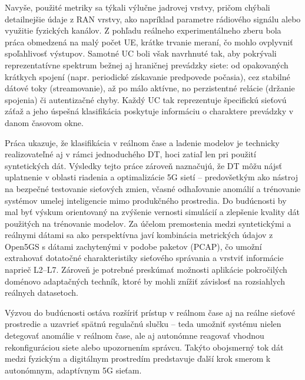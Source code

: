 Navyše, použité metriky sa týkali výlučne jadrovej vrstvy, pričom chýbali detailnejšie údaje z RAN vrstvy, ako napríklad parametre rádiového signálu alebo využitie fyzických kanálov. Z pohľadu reálneho experimentálneho zberu bola práca obmedzená na malý počet UE, krátke trvanie meraní, čo mohlo ovplyvniť spoľahlivosť výstupov. Samotné UC boli však navrhnuté tak, aby pokrývali reprezentatívne spektrum bežnej aj hraničnej prevádzky siete: od opakovaných krátkych spojení (napr. periodické získavanie predpovede počasia), cez stabilné dátové toky (streamovanie), až po málo aktívne, no perzistentné relácie (držanie spojenia) či autentizačné chyby. Každý UC tak reprezentuje špecifickú sieťovú záťaž a jeho úspešná klasifikácia poskytuje informáciu o charaktere prevádzky v danom časovom okne.

Práca ukazuje, že klasifikácia v reálnom čase a ladenie modelov je technicky realizovateľné aj v rámci jednoduchého DT, hoci zatiaľ len pri použití syntetických dát. Výsledky tejto práce zároveň naznačujú, že DT môžu nájsť uplatnenie v oblasti riadenia a optimalizácie 5G sietí – predovšetkým ako nástroj na bezpečné testovanie sieťových zmien, včasné odhaľovanie anomálií a trénovanie systémov umelej inteligencie mimo produkčného prostredia. Do budúcnosti by mal byť výskum orientovaný na zvýšenie vernosti simulácií a zlepšenie kvality dát použitých na trénovanie modelov. Za účelom premostenia medzi syntetickými a reálnymi dátami sa ako perspektívna javí kombinácia metrických údajov z Open5GS s dátami zachytenými v podobe paketov (PCAP), čo umožní extrahovať dotatočné charakteristiky sieťového správania a vrstviť informácie naprieč L2–L7. Zároveň je potrebné preskúmať možnosti aplikácie pokročilých doménovo adaptačných techník, ktoré by mohli znížiť závislosť na rozsiahlych reálnych datasetoch.

Výzvou do budúcnosti ostáva rozšíriť prístup v reálnom čase aj na reálne sieťové prostredie a uzavrieť spätnú regulačnú slučku – teda umožniť systému nielen detegovať anomálie v reálnom čase, ale aj autonómne reagovať vhodnou rekonfiguráciou siete alebo upozornením správcu. Takýto obojsmerný tok dát medzi fyzickým a digitálnym prostredím predstavuje ďalší krok smerom k autonómnym, adaptívnym 5G sieťam.